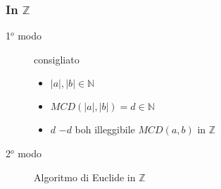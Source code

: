     \subsubsection{In $\mathbb{Z}$}
    \begin{description}
        \item[1$^o$ modo] consigliato
            \begin{itemize}
                \item $|a|,|b|\in\mathbb{N}$
                \item $MCD(|a|,|b|)=d\in\mathbb{N}$
                \item $d$  $-d$ boh illeggibile \hspace{1cm} $MCD(a,b)$ in $\mathbb{Z}$
            \end{itemize}
        \item[2$^o$ modo] Algoritmo di Euclide in $\mathbb{Z}$
    \end{description}
